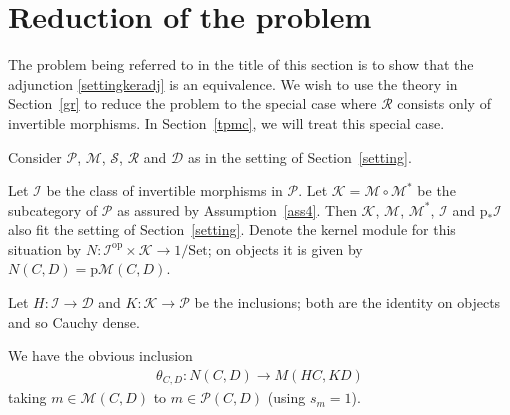 \documentclass[a4paper,12pt,reqno]{amsart}
\theoremstyle{definition}
\theoremstyle{fact}
\theoremstyle{genquest}
\theoremstyle{step}
\newcommand{\dd}{\colon}
\newcommand{\ra}{\rightarrow}
\def\CD{{\mathscr D}}
\def\CI{{\mathscr I}}
\def\CK{{\mathscr K}}
\def\CM{{\mathscr M}}
\def\CP{{\mathscr P}}
\def\CR{{\mathscr R}}
\def\CS{{\mathscr S}}
\begin{document}
\section{Reduction of the problem}\label{reducto}

The problem being referred to in the title of this section is to show that the adjunction \eqref{settingkeradj} is an equivalence. 
We wish to use the theory in Section~\ref{gr} to reduce the problem to the 
special case where $\CR$ consists only of invertible morphisms. 
In Section~\ref{tpmc}, we will treat this special case. 

Consider $\CP$, $\CM$, $\CS$, $\CR$ and $\CD$ as in the setting of Section~\ref{setting}.

Let $\CI$ be the class of invertible morphisms in $\CP$.
Let $\CK = \CM\circ \CM^*$ be the subcategory of $\CP$ as assured by 
Assumption~\ref{ass4}.
Then $\CK$, $\CM$, $\CM^*$, $\CI$ and $\mathrm{p}_*\CI$ also fit the setting of Section~\ref{setting}.
Denote the kernel module for this situation by 
$N \dd \CI^{\mathrm{op}} \times \CK \ra 1/\mathrm{Set}$;
on objects it is given by $N(C,D) = \mathrm{p}\CM(C,D)$.  

Let $H\dd \CI \ra \CD$ and $K\dd \CK \ra \CP$ be the inclusions;
both are the identity on objects and so Cauchy dense. 

We have the obvious inclusion  
\begin{eqnarray}\label{specialtheta}
\theta_{C,D} \dd N(C,D) \ra M(HC,KD)
\end{eqnarray}
taking $m\in \CM(C,D)$ to $m \in \CP(C,D)$ (using $s_m = 1$).
\end{document}
